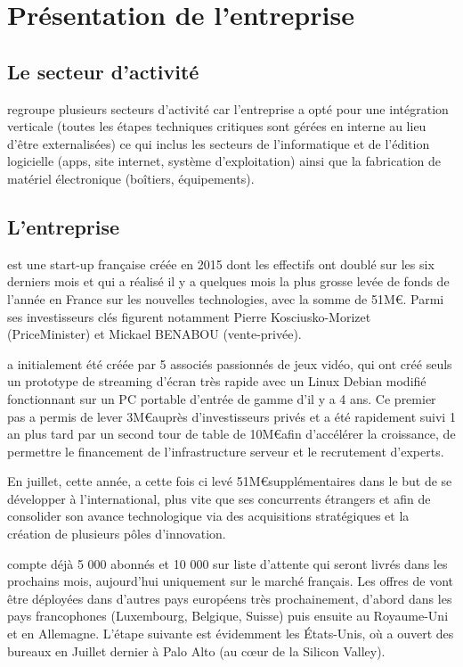 \section{Présentation de l'entreprise}

\subsection{Le secteur d'activité}

\B regroupe plusieurs secteurs d'activité car l'entreprise a opté pour une
intégration verticale (toutes les étapes techniques critiques sont gérées en
interne au lieu d'être externalisées) ce qui inclus les secteurs de
l'informatique et de l'édition logicielle (apps, site internet, système
d'exploitation) ainsi que la fabrication de matériel électronique (boîtiers,
équipements).



\subsection{L'entreprise}

\B est une start-up française créée en 2015 dont les effectifs ont doublé sur
les six derniers mois et qui a réalisé il y a quelques mois la plus grosse
levée de fonds de l'année en France sur les nouvelles technologies, avec la
somme de 51M\euro. Parmi ses investisseurs clés figurent notamment Pierre
Kosciusko-Morizet (PriceMinister) et Mickael BENABOU (vente-privée).

\B a initialement été créée par 5 associés passionnés de jeux vidéo, qui ont
créé seuls un prototype de streaming d'écran très rapide avec un Linux Debian
modifié fonctionnant sur un PC portable d'entrée de gamme d'il y a 4 ans. Ce
premier pas a permis de lever 3M\euro auprès d'investisseurs privés et a été
rapidement suivi 1 an plus tard par un second tour de table de 10M\euro afin
d'accélérer la croissance, de permettre le financement de l'infrastructure
serveur et le recrutement d'experts.

En juillet, cette année, \B a cette fois ci levé 51M\euro supplémentaires dans le
but de se développer à l'international, plus vite que ses concurrents étrangers
et afin de consolider son avance technologique via des acquisitions
stratégiques et la création de plusieurs pôles d'innovation.

\B compte déjà 5 000 abonnés et 10 000 sur liste d'attente qui seront livrés
dans les prochains mois, aujourd'hui uniquement sur le marché français.
Les offres de \B vont être déployées dans d'autres pays européens très prochainement,
d'abord dans les pays francophones (Luxembourg, Belgique, Suisse) puis ensuite
au Royaume-Uni et en Allemagne.
L'étape suivante est évidemment les États-Unis, où \B a ouvert des bureaux en
Juillet dernier à Palo Alto (au c\oe ur de la Silicon Valley).

